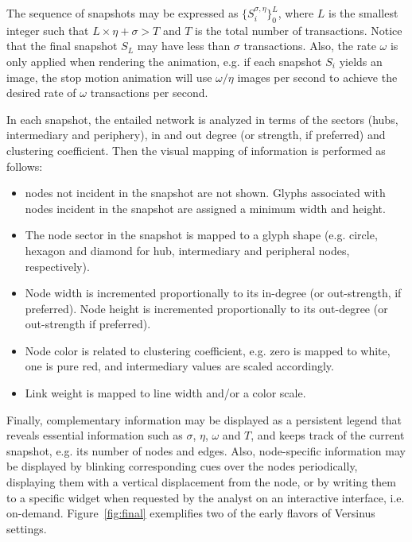 \documentclass[runningheads]{llncs}
\begin{document}
\noindent The sequence of snapshots may be expressed as $\{S_i^{\sigma, \eta}\}_0^{L}$, where $L$ is the smallest integer such that $L\times \eta + \sigma > T$ and $T$ is the total number of transactions. Notice that the final snapshot $S_L$ may have less than $\sigma$ transactions. Also, the rate $\omega$ is only applied when rendering the animation, e.g. if each snapshot $S_i$ yields an image, the stop motion animation will use $\omega/\eta$ images per second to achieve the desired rate of $\omega$ transactions per second.

In each snapshot, the entailed network is analyzed in terms of the sectors (hubs, intermediary and periphery), in and out degree (or strength, if preferred) and clustering coefficient. Then the visual mapping of information is performed as follows:
\begin{itemize}
  \item nodes not incident in the snapshot are not shown. Glyphs associated with nodes incident in the snapshot are assigned a minimum width and height.
  \item The node sector in the snapshot is mapped to a glyph shape (e.g. circle, hexagon and diamond for hub, intermediary and peripheral nodes, respectively).
  \item Node width is incremented proportionally to its in-degree (or out-strength, if preferred). Node height is incremented proportionally to its out-degree (or out-strength if preferred).
  \item Node color is related to clustering coefficient, e.g. zero is mapped to white, one is pure red, and intermediary values are scaled accordingly.
  \item Link weight is mapped to line width and/or a color scale.
\end{itemize}

\noindent Finally, complementary information may be displayed as a persistent legend that reveals essential information such as $\sigma$, $\eta$, $\omega$ and $T$, and keeps track of the current snapshot, e.g. its number of nodes and edges.
Also, node-specific information may be displayed by blinking corresponding cues over the nodes periodically, displaying them with a vertical displacement from the node, or by writing them to a specific widget when requested by the analyst on an interactive interface, i.e. on-demand.
Figure~\ref{fig:final} exemplifies two of the early flavors of Versinus settings.
\end{document}
